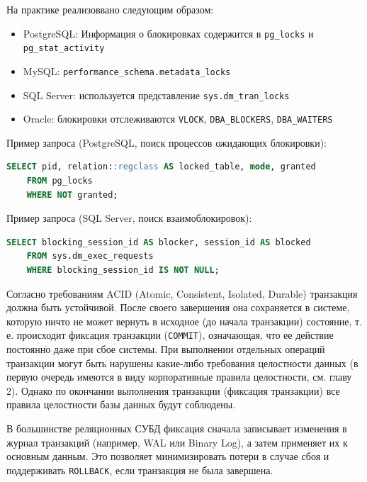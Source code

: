 На практике реализоввано следующим образом:
\begin{itemize}
    \item PostgreSQL: Информация о блокировках содержится в \texttt{pg\_locks} и \texttt{pg\_stat\_activity} \autocites[§52.12]{PostgreSQLdocc52}[§27.2.3]{PostgreSQLdocc27}
    \item MySQL: \texttt{performance\_schema.metadata\_locks} \autocite[§29.12.13]{Mysqldoc2}
    \item SQL Server: используется представление \texttt{sys.dm\_tran\_locks} \autocite{MicrosoftLearnSQLserverTranLocks}
    \item Oracle: блокировки отслеживаются \texttt{V\textdollar LOCK}, \texttt{DBA\_BLOCKERS}, \texttt{DBA\_WAITERS} \autocites[c.8 §40]{oracledbdoc2}[c.4 §180, c.6 §103]{oracledbdoc1}
\end{itemize}

Пример запроса (PostgreSQL, поиск процессов ожидающих блокировки):
\begin{lstlisting}[language=SQL]
    SELECT pid, relation::regclass AS locked_table, mode, granted
    FROM pg_locks
    WHERE NOT granted;              
\end{lstlisting}

Пример запроса (SQL Server, поиск взаимоблокировок):
\begin{lstlisting}[language=SQL]
    SELECT blocking_session_id AS blocker, session_id AS blocked
    FROM sys.dm_exec_requests
    WHERE blocking_session_id IS NOT NULL;             
\end{lstlisting}

Согласно требованиям ACID (Atomic, Consistent, Isolated, Durable) транзакция должна быть устойчивой. После своего завершения она сохраняется в системе, которую ничто не может вернуть в исходное (до начала транзакции) состояние, т. е. происходит фиксация транзакции (\texttt{COMMIT}), означающая, что ее действие постоянно даже при сбое системы. При выполнении отдельных операций транзакции могут быть нарушены какие-либо требования целостности данных (в первую очередь имеются в виду корпоративные правила целостности, см. главу 2). Однако по окончании выполнения транзакции (фиксация транзакции) все правила целостности базы данных будут соблюдены.

В большинстве реляционных СУБД фиксация сначала записывает изменения в журнал транзакций (например, WAL или Binary Log), а затем применяет их к основным данным. Это позволяет минимизировать потери в случае сбоя и поддерживать \texttt{ROLLBACK}, если транзакция не была завершена.

